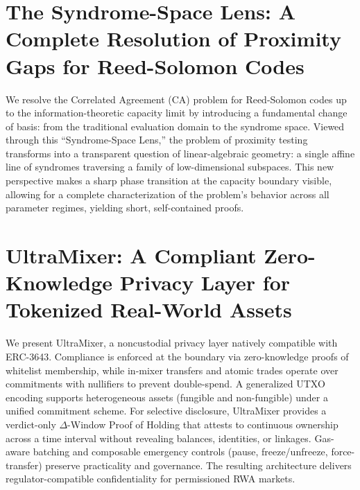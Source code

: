 \documentclass[11pt,oneside]{book}
\theoremstyle{definition}
\theoremstyle{remark}
\theoremstyle{plain}
\begin{document}
\section{\cite{cryptoeprint:2025/1712} The Syndrome-Space Lens: A Complete Resolution of Proximity Gaps for Reed-Solomon Codes}

We resolve the Correlated Agreement (CA) problem for Reed-Solomon codes up to the information-theoretic capacity limit by introducing a fundamental change of basis: from the traditional evaluation domain to the syndrome space. Viewed through this “Syndrome-Space Lens,” the problem of proximity testing transforms into a transparent question of linear-algebraic geometry: a single affine line of syndromes traversing a family of low-dimensional subspaces. This new perspective makes a sharp phase transition at the capacity boundary visible, allowing for a complete characterization of the problem's behavior across all parameter regimes, yielding short, self-contained proofs. 

\section{\cite{cryptoeprint:2025/1715} UltraMixer: A Compliant Zero-Knowledge Privacy Layer for Tokenized Real-World Assets}
We present UltraMixer, a noncustodial privacy layer natively compatible with ERC-3643. Compliance is enforced at the boundary via zero-knowledge proofs of whitelist membership, while in-mixer transfers and atomic trades operate over commitments with nullifiers to prevent double-spend. A generalized UTXO encoding supports heterogeneous assets (fungible and non-fungible) under a unified commitment scheme. For selective disclosure, UltraMixer provides a verdict-only $\Delta$-Window Proof of Holding that attests to continuous ownership across a time interval without revealing balances, identities, or linkages. Gas-aware batching and composable emergency controls (pause, freeze/unfreeze, force-transfer) preserve practicality and governance. The resulting architecture delivers regulator-compatible confidentiality for permissioned RWA markets.
\end{document}

